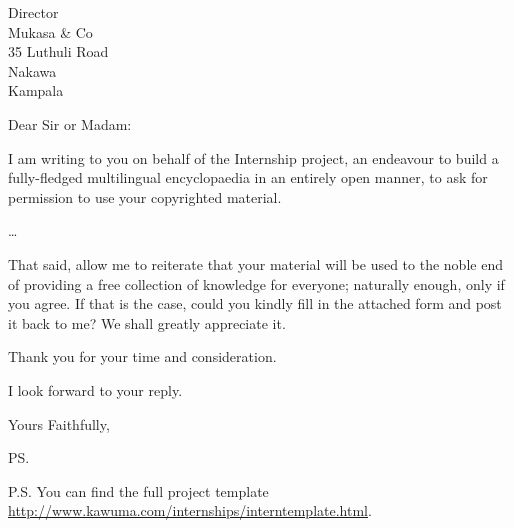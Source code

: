 \documentclass{letter}
\begin{document}
\begin{letter}{Director \\ Mukasa \& Co \\ 35 Luthuli Road
\\ Nakawa \\ Kampala}
\opening{Dear Sir or Madam:}

I am writing to you on behalf of the Internship project,
an endeavour to build a fully-fledged multilingual encyclopaedia in an entirely
open manner, to ask for permission to use your copyrighted material.

\ldots 

That said, allow me to reiterate that your material will be used to the noble end of
providing a free collection of knowledge for everyone; naturally enough, only if you
agree. If that is the case, could you kindly fill in the attached form and post it
back to me? We shall greatly appreciate it.

Thank you for your time and consideration.

I look forward to your reply.

\closing{Yours Faithfully,}

\ps

P.S. You can find the full project template
\url{http://www.kawuma.com/internships/interntemplate.html}.


\end{letter}
\end{document}
